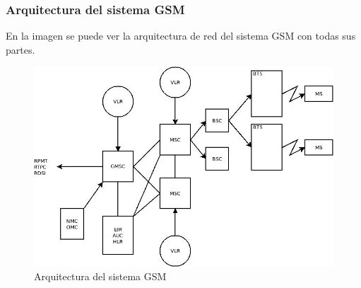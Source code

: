 \subsubsection{Arquitectura del sistema \acrshort{GSM}}
\label{ssub:arquiGSM}
En la imagen se puede ver la arquitectura de red del sistema \acrshort{GSM} con todas sus partes.
\begin{figure}[H]
\centering
\includegraphics[width=\textwidth]{Imagen/diaGSM.jpg}
\caption{Arquitectura del sistema \acrshort{GSM}}
\label{img:arquiGSM}
\end{figure}
